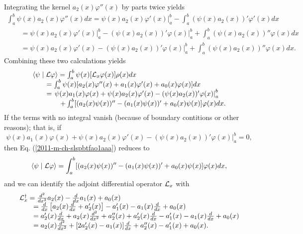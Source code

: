 Integrating the  kernel $a_2(x) \varphi''(x)$ by parts twice yields
\begin{equation}
\begin{array}  {l}
\int_a^b
\psi (x)
  a_2(x) \varphi''(x)
dx
=
\left.
\psi (x)
  a_2(x) \varphi'(x)
\right|_a^b -  \int_a^b
(\psi (x)
  a_2(x) )'\varphi'(x)
dx
\\
\qquad =
\left.
\psi (x)
  a_2(x) \varphi'(x)
\right|_a^b -
\left.
(\psi (x)
  a_2(x))' \varphi(x)
\right|_a^b
+
  \int_a^b
(\psi (x)
  a_2(x) )''\varphi(x)
dx    \\
\qquad =
\left.
\psi (x)
  a_2(x) \varphi'(x)
 -
(\psi (x)
  a_2(x))' \varphi(x)
\right|_a^b
+
  \int_a^b
(\psi (x)
  a_2(x) )''\varphi(x)
dx
.
\end{array}
\end{equation}
Combining these two calculations yields
\begin{equation}
\begin{array}  {l}
\langle \psi \mid {\cal L} \varphi \rangle
=
\int_a^b
\psi (x) [{\cal L}_x\varphi (x)]
\rho  (x)         dx   \\
\qquad =
\int_a^b
\psi (x)
[a_2(x) \varphi''(x) + a_1(x) \varphi'(x) + a_0(x) \varphi (x)]
dx      \\
\qquad =
\left.
\psi (x)
  a_1(x) \varphi(x)
+
\psi (x)
  a_2(x) \varphi'(x)
 -
(\psi (x)
  a_2(x))' \varphi(x)
\right|_a^b   \\
\qquad
\qquad
+
  \int_a^b
[( a_2(x)\psi (x) )'' - ( a_1(x)\psi (x)  )'    + a_0(x) \psi (x)] \varphi(x)
dx
.
\end{array}
\label{2011-m-ch-slspbtfao1aaa}
\end{equation}
If the terms with no integral vanish (because of boundary contitions or other reasons); that is, if
$$
\left.
\psi (x)
  a_1(x) \varphi(x)
+
\psi (x)
  a_2(x) \varphi'(x)
 -
(\psi (x)
  a_2(x))' \varphi(x)
\right|_a^b
=0,
$$
then Eq. (\ref{2011-m-ch-slspbtfao1aaa}) reduces to
\begin{equation}
\langle \psi \mid {\cal L} \varphi \rangle
=
  \int_a^b
[( a_2(x)\psi (x) )'' - ( a_1(x)\psi (x)  )'    + a_0(x) \psi (x)] \varphi(x)
dx
,
\label{2011-m-ch-slspbtfao1aaa1}
\end{equation}
and we can identify the adjoint differential operator ${\cal L}_x$ with
\begin{equation}
\begin{array}  {l}
{\cal L}_x^\dagger
=\frac{d^2}{dx^2}  a_2(x)  - \frac{d }{dx } a_1(x)    + a_0(x) \\
\qquad =
\frac{d}{dx} \left[ a_2(x) \frac{d}{dx} + a'_2(x)\right]  - a'_1(x) - a_1(x)\frac{d }{dx }    + a_0(x) \\
\qquad =
 a'_2(x) \frac{d}{dx} + a_2(x) \frac{d^2}{dx^2} + a''_2(x) + a'_2(x)\frac{d}{dx}
  - a'_1(x) - a_1(x)\frac{d }{dx }    + a_0(x)  \\
\qquad =
 a_2(x) \frac{d^2}{dx^2}
+
[2 a'_2(x)- a_1(x) ]  \frac{d}{dx}
+ a''_2(x)   - a'_1(x)   + a_0(x)
.
\end{array}
\label{2011-m-ch-slspbtfaob}
\end{equation}

